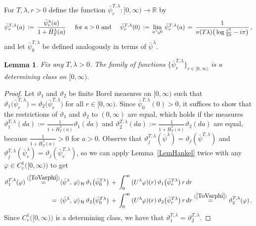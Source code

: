 \documentclass[10pt]{article}
\def\stackrel#1#2{\mathrel{\mathop{#2}\limits^{#1}}}
\numberwithin{equation}{section}
\newtheorem{lemma}[theorem]{Lemma}
\theoremstyle{definition}
\newcommand{\R}{{\mathbb R}}
\begin{document}
\begin{appendix}
   For $T,\lambda, r>0$ define the function $\bar{\psi}^{T,\lambda}_r:[0,\infty)\rightarrow \R$ by
\begin{align*}
\bar{\psi}^{T,\lambda}_r(a)\,:=\,  \frac{\bar{\psi}^{\lambda}_r(a)}{ 1+\bar{H}_{T}^{\lambda}(a)}  \hspace{.5cm}\text{for $a>0$ and} \hspace{.5cm}\bar{\psi}^{T,\lambda}_r(0)\,:=\, \lim_{a\searrow 0}\,\bar{\psi}^{T,\lambda}_r(a)\,=\, \frac{  1 }{ \nu(T\lambda)  \big(\log \frac{r^2}{2\lambda}-i\pi\big) }   \,,
\end{align*}
and let  $\bar{\psi}^{T,\lambda}_0$ be defined analogously in terms of $\bar{\psi}^{\lambda}$. 
\begin{lemma}\label{LemmaSpanII} Fix any $T,\lambda> 0$.  The family of functions  $\{\bar{\psi}^{T,\lambda}_r\}_{r\in [0,\infty)}$ is a determining class  on $[0,\infty)$.
\end{lemma}
\begin{proof} Let $\vartheta_1$ and $\vartheta_2$ be finite Borel measures on $[0,\infty)$ such that $\vartheta_1\big(\bar{\psi}^{T,\lambda}_r\big)=\vartheta_2\big(\bar{\psi}^{T,\lambda}_r\big)  $ for all $r\in [0,\infty)$. Since $\bar{\psi}^{T,\lambda}_0(0)>0$, it suffices to show that the restrictions of $\vartheta_1$ and $\vartheta_2$ to $(0,\infty)$ are equal, which holds if the measures $\vartheta_1^{T,\lambda}(da):=\frac{1}{ 1+\bar{H}_{T}^{\lambda}(a)}\vartheta_1(da)  $ and $\vartheta_2^{T,\lambda}(da):=\frac{1}{ 1+\bar{H}_{T}^{\lambda}(a)}\vartheta_2(da)  $ are equal, because $\frac{1}{ 1+\bar{H}_{T}^{\lambda}(a)} >0$ for $a>0$.  Observe that $\vartheta_j^{T,\lambda}(\bar{\psi}^{\lambda})=\vartheta_j(\bar{\psi}^{T,\lambda})$ and  $\vartheta_j^{T,\lambda}(\bar{\psi}^{\lambda}_r)=\vartheta_j(\bar{\psi}^{T,\lambda}_r)$, so we
 can apply Lemma~\ref{LemHankel} twice with any $\varphi\in C^{1}_c\big([0,\infty)\big)$ to get
\begin{align*}
\vartheta_1^{T,\lambda}(\varphi)\stackrel{(\ref{ToVarphi})}{=} &\langle \bar{\psi}^{\lambda} ,\, \varphi\rangle_{\mathcal{H}}\,\vartheta_1\big(\bar{\psi}^{T\lambda}_0\big)  \,+\, \int_0^{\infty}\,(U^{\lambda}\varphi)(r)\,\vartheta_1\big(\bar{\psi}^{T\lambda}_r\big)\,r\, dr \\  \,=\,\,\,&  \langle \bar{\psi}^{\lambda} ,\, \varphi\rangle_{\mathcal{H}}\,\vartheta_2\big(\bar{\psi}^{T\lambda}_0\big)  \,+\, \int_0^{\infty}\,(U^{\lambda}\varphi)(r)\,\vartheta_2\big(\bar{\psi}^{T\lambda}_r\big)\,r\, dr     \stackrel{(\ref{ToVarphi})}{=}  \vartheta_2^{T,\lambda}(\varphi)\,.
\end{align*}
Since $C^{1}_c\big([0,\infty)\big)$ is a determining class, we have that $\vartheta_1^{T,\lambda} =\vartheta_2^{T,\lambda} $.
\end{proof}





\end{appendix}
\end{document}
